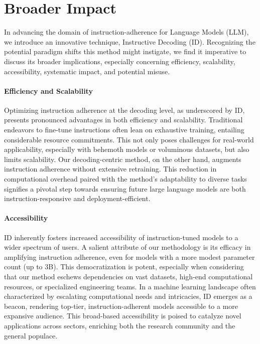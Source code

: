 \clearpage
\appendix
\appendixpage

\startcontents[sections]

\section{Broader Impact}
\label{sec:broad}
In advancing the domain of instruction-adherence for Language Models (LLM), we introduce an innovative technique, Instructive Decoding (ID). Recognizing the potential paradigm shifts this method might instigate, we find it imperative to discuss its broader implications, especially concerning efficiency, scalability, accessibility, systematic impact, and potential misuse.

\paragraph{Efficiency and Scalability}
Optimizing instruction adherence at the decoding level, as underscored by ID, presents pronounced advantages in both efficiency and scalability. Traditional endeavors to fine-tune instructions often lean on exhaustive training, entailing considerable resource commitments. This not only poses challenges for real-world applicability, especially with behemoth models or voluminous datasets, but also limits scalability. Our decoding-centric method, on the other hand, augments instruction adherence without extensive retraining. This reduction in computational overhead paired with the method's adaptability to diverse tasks signifies a pivotal step towards ensuring future large language models are both instruction-responsive and deployment-efficient.


\paragraph{Accessibility}
ID inherently fosters increased accessibility of instruction-tuned models to a wider spectrum of users. A salient attribute of our methodology is its efficacy in amplifying instruction adherence, even for models with a more modest parameter count (up to 3B). This democratization is potent, especially when considering that our method eschews dependencies on vast datasets, high-end computational resources, or specialized engineering teams. In a machine learning landscape often characterized by escalating computational needs and intricacies, ID emerges as a beacon, rendering top-tier, instruction-adherent models accessible to a more expansive audience. This broad-based accessibility is poised to catalyze novel applications across sectors, enriching both the research community and the general populace.


